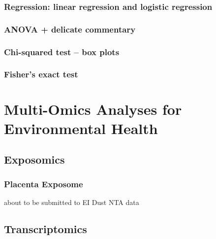 \documentclass[
]{book}
\begin{document}
\hypertarget{regression-linear-regression-and-logistic-regression}{%
\subsection{Regression: linear regression and logistic regression}\label{regression-linear-regression-and-logistic-regression}}

\hypertarget{anova-delicate-commentary}{%
\subsection{ANOVA + delicate commentary}\label{anova-delicate-commentary}}

\hypertarget{chi-squared-test-box-plots}{%
\subsection{Chi-squared test -- box plots}\label{chi-squared-test-box-plots}}

\hypertarget{fishers-exact-test}{%
\subsection{Fisher's exact test}\label{fishers-exact-test}}

\hypertarget{multi-omics-analyses-for-environmental-health}{%
\chapter{Multi-Omics Analyses for Environmental Health}\label{multi-omics-analyses-for-environmental-health}}

\hypertarget{exposomics}{%
\section{Exposomics}\label{exposomics}}

\hypertarget{placenta-exposome}{%
\subsection{Placenta Exposome}\label{placenta-exposome}}

about to be submitted to EI
Dust NTA data

\hypertarget{transcriptomics}{%
\section{Transcriptomics}\label{transcriptomics}}
\end{document}
